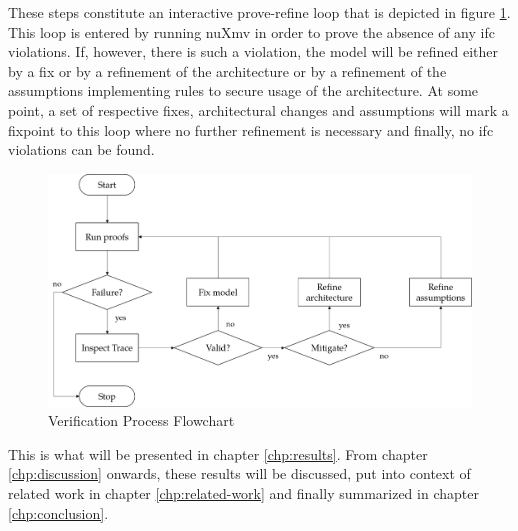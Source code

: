 These steps constitute an interactive prove-refine loop that is depicted in figure \ref{fig:ver-process}.
This loop is entered by running nuXmv in order to prove the absence of any \gls{ifc} violations.
If, however, there is such a violation, the model will be refined either by a fix or by a refinement of the architecture or by a refinement of the assumptions implementing rules to secure usage of the architecture.
At some point, a set of respective fixes, architectural changes and assumptions will mark a fixpoint to this loop where no further refinement is necessary and finally, no \gls{ifc} violations can be found.

\begin{figure}
    \centering
    \includegraphics[width=\textwidth]{figures/verfification-process.png}
    \caption{Verification Process Flowchart}
    \label{fig:ver-process}
\end{figure}

This is what will be presented in chapter \ref{chp:results}.
From chapter \ref{chp:discussion} onwards, these results will be discussed, put into context of related work in chapter \ref{chp:related-work} and finally summarized in chapter \ref{chp:conclusion}.
